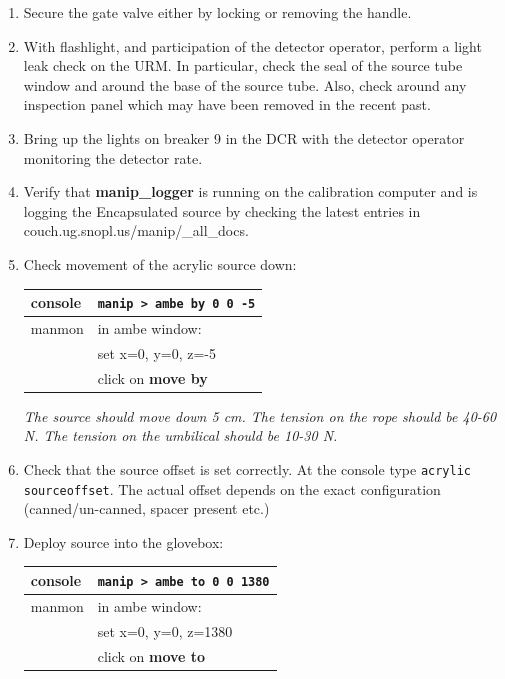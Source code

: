 \begin{enumerate}
\item \CheckBox[name=encp32]{} Secure the gate valve either by locking or removing the handle.
\item \CheckBox[name=encp33]{} With flashlight, and participation of the detector operator,
  perform a light leak check on the URM. In particular, check the seal
  of the source tube window and around the base of the source
  tube. Also, check around any inspection panel which may have been
  removed in the recent past.
\item \CheckBox[name=encp34]{} Bring up the lights on breaker 9 in the DCR with the detector
  operator monitoring the detector rate.
\item \CheckBox[name=encp35]{} Verify that {\bf manip\_logger} is running on the calibration
  computer and is logging the Encapsulated source by checking the latest
  entries in couch.ug.snopl.us/manip/\_all\_docs.
\item \CheckBox[name=encp36]{} Check movement of the acrylic source down:
  \begin{center}
    \begin{tabular}{|l|l|}
      \hline
      console & \verb+manip > ambe by 0 0 -5+ \\
      \hline
      manmon & in ambe window: \\
      & set x=0, y=0, z=-5\\
      & click on {\bf move by} \\
      \hline
    \end{tabular}
  \end{center}
  {\it The source should move down 5 cm. The tension on the rope
    should be 40-60 N. The tension on the umbilical should be 10-30
    N.}
\item \CheckBox[name=encp37]{} Check that the source offset is set correctly. At the console
  type \verb+acrylic sourceoffset+. The actual offset depends on the
  exact configuration (canned/un-canned, spacer present etc.)
\item \CheckBox[name=encp38]{} Deploy source into the glovebox:
  \begin{center}
    \begin{tabular}{|l|l|}
      \hline
      console & \verb+manip > ambe to 0 0 1380+ \\
      \hline
      manmon & in ambe window: \\
      & set x=0, y=0, z=1380\\
      & click on {\bf move to} \\
      \hline

\end{tabular}
\end{center}
\end{enumerate}

